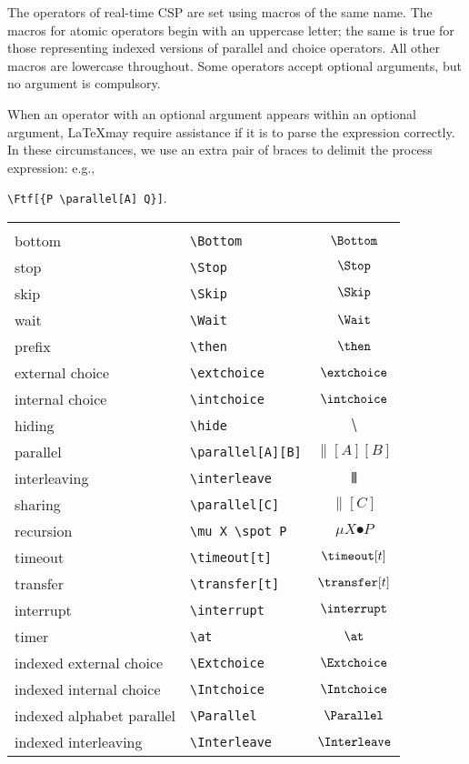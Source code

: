 \documentclass[12pt]{article}
\begin{document}
The operators of real-time CSP are set using macros of the same name.
The macros for atomic operators begin with an uppercase letter; the
same is true for those representing indexed versions of parallel and
choice operators.  All other macros are lowercase throughout.  Some
operators accept optional arguments, but no argument is compulsory.

When an operator with an optional argument appears within an optional
argument, \LaTeX may require assistance if it is to parse the
expression correctly.  In these circumstances, we use an extra pair of
braces to delimit the process expression: e.g., 
\begin{center}
  \verb|\Ftf[{P \parallel[A] Q}]|.
\end{center}

\begin{tabular}{p{2in}p{1.5in}c} \\ \\
bottom          & \verb|\Bottom|        & $ \Bottom  $  \\[1ex]
stop            & \verb|\Stop|          & $ \Stop    $  \\[1ex]
skip            & \verb|\Skip|          & $ \Skip    $  \\[1ex]
wait            & \verb|\Wait|          & $ \Wait $     \\[1ex]
prefix          & \verb|\then|          & $ \then $     \\[1ex]
external choice & \verb|\extchoice|     & $ \extchoice $ \\[1ex]
internal choice & \verb|\intchoice|     & $ \intchoice $ \\[1ex]
hiding          & \verb|\hide|          & $ \hide $ \\[1ex]
parallel        & \verb|\parallel[A][B]|& $ \parallel[A][B] $\\[1ex]
interleaving    & \verb|\interleave|    & $ \interleave $ \\[1ex]
sharing         & \verb|\parallel[C]|   & $ \parallel[C] $ \\[1ex]
recursion       & \verb|\mu X \spot P|  & $ \mu X \spot P $ \\[1ex]
timeout         & \verb|\timeout[t]|    & $\timeout[t]$\\[1ex]
transfer        & \verb|\transfer[t]|   & $\transfer[t]$\\[1ex]
interrupt       & \verb|\interrupt|     & $\interrupt$ \\[1ex]
timer           & \verb|\at|            & $\at$ \\[1ex]
indexed external choice & \verb|\Extchoice| & $ \Extchoice $ \\[1ex]
indexed internal choice & \verb|\Intchoice| & $ \Intchoice $ \\[1ex]
indexed alphabet parallel & \verb|\Parallel| & $ \Parallel $ \\[1ex]
indexed interleaving & \verb|\Interleave| & $ \Interleave $
\end{tabular}
\end{document}
